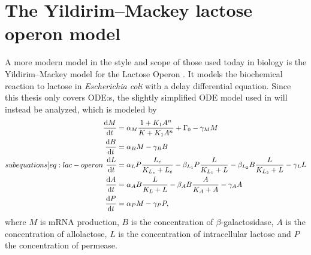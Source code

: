 \section{The Yildirim--Mackey lactose operon model}

A more modern model in the style and scope of those used today in biology is the Yildirim--Mackey model for the Lactose Operon \cite{yildirim2003feedback}.
It models the biochemical reaction to lactose in \textit{Escherichia coli} with a delay differential equation. %
Since this thesis only covers ODE:s, the slightly simplified ODE model used in \cite{yildirim2011deterministic} will instead be analyzed, which is modeled by
\begin{subequations} \label[subequations]{eq:lac-operon}
  \begin{align}
    \diff{M}{t} &= \alpha_M \frac{1 + K_1 A^n}{K + K_1 A^n} + \Gamma_0 - \gamma_M M \label{eq:lac-operon-a}\\
    \diff{B}{t} &= \alpha_B M - \gamma_B B \\
    \diff{L}{t} &= \alpha_L P \frac{L_e}{K_{L_e} + L_e} - \beta_{L_1} P \frac{L}{K_{L_1} + L} - \beta_{L_2} B \frac{L}{K_{L_2} + L} - \gamma_L L \\
    \diff{A}{t} &= \alpha_A B \frac{L}{K_L + L} - \beta_A B \frac{A}{K_A + A} - \gamma_A A \\
    \diff{P}{t} &= \alpha_P M - \gamma_P P,
  \end{align}
\end{subequations}
where \(M\) is mRNA production, \(B\) is the concentration of \(\beta\)-galactosidase, \(A\) is the concentration of allolactose, \(L\) is the concentration of intracellular lactose and \(P\) the concentration of permease. %
